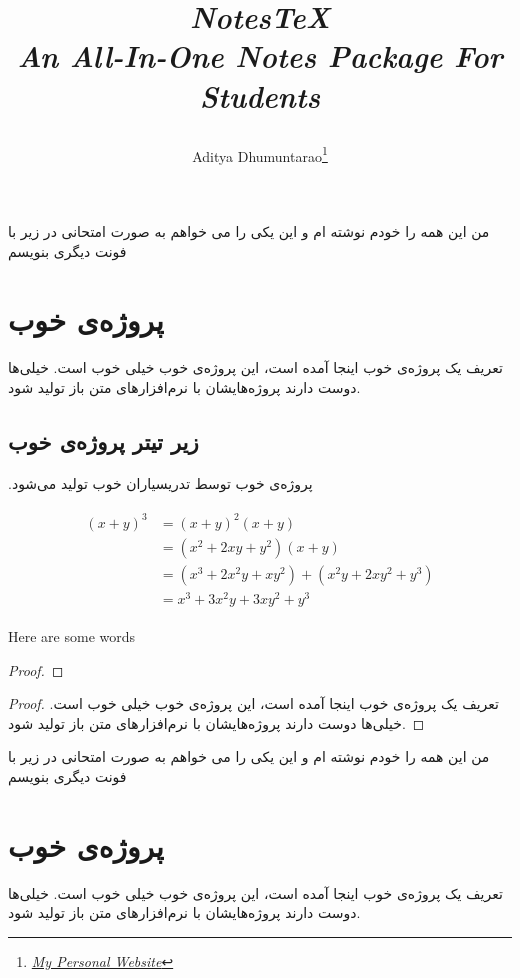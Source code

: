 \documentclass[10pt,twoside]{article}
\title{\begin{center}{\Huge \textit{NotesTeX}}\\{{\itshape An All-In-One Notes Package For Students}}\end{center}}
\author{Aditya Dhumuntarao\footnote{\href{https://geodesick.com/}{\textit{My Personal Website}}}}
\begin{document}
\pagestyle{fancynotes}
\noindent من این همه را خودم نوشته ام و این یکی را می خواهم به صورت امتحانی در زیر با فونت 
دیگری بنویسم 

\section{پروژه‌ی خوب}
\par
تعریف یک پروژه‌ی خوب اینجا آمده است، این پروژه‌ی خوب خیلی خوب است.
خیلی‌ها دوست دارند پروژه‌هایشان با نرم‌افزارهای متن باز تولید شود.

\subsection{زیر تیتر پروژه‌ی خوب}
\par
.پروژه‌ی خوب توسط تدریسیاران خوب تولید می‌شود

\begin{align}
\begin{split}
(x+y)^3 &= (x+y)^2(x+y)\\
&=(x^2+2xy+y^2)(x+y)\\
&=(x^3+2x^2y+xy^2) + (x^2y+2xy^2+y^3)\\
&=x^3+3x^2y+3xy^2+y^3
\end{split}					
\end{align}

Here are some words 

\begin{latin}
	\begin{proof}
	\lipsum[1]
	\end{proof}
\end{latin}

\begin{proof}
	تعریف یک پروژه‌ی خوب اینجا آمده است، این پروژه‌ی خوب خیلی خوب است.
	خیلی‌ها دوست دارند پروژه‌هایشان با نرم‌افزارهای متن باز تولید شود.
\end{proof}

\newpage

\noindent من این همه را خودم نوشته ام و این یکی را می خواهم به صورت امتحانی در زیر با فونت 
دیگری بنویسم 

\section{پروژه‌ی خوب}
\par
تعریف یک پروژه‌ی خوب اینجا آمده است، این پروژه‌ی خوب خیلی خوب است.
خیلی‌ها دوست دارند پروژه‌هایشان با نرم‌افزارهای متن باز تولید شود.
\end{document}
